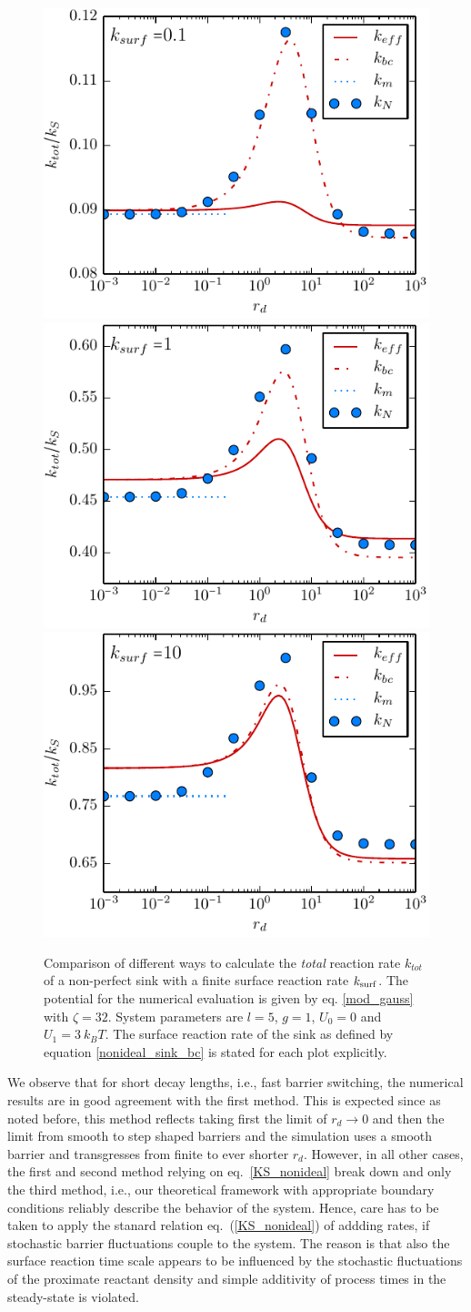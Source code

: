 \documentclass[preprint,superscriptaddress]{revtex4-1}
\begin{document}
\begin{figure}[H]
        \includegraphics[width = .32 \textwidth]{plots/rep_rate_comparison0.pdf} 
        \includegraphics[width = .32 \textwidth]{plots/rep_rate_comparison1.pdf} 
        \includegraphics[width = .32 \textwidth]{plots/rep_rate_comparison2.pdf}
        \caption{Comparison of different ways to calculate the {\it total} reaction rate $k_{tot}$ of a non-perfect sink with a finite surface reaction rate $k_{\rm surf}$. 
        The potential for the numerical evaluation is given by eq. \eqref{mod_gauss} with $\zeta = 32$. System parameters are $l = 5$, $g=1$, 
        $U_0 = 0$ and $U_1 = 3 ~k_B T$. The surface reaction rate of the sink as defined by equation \eqref{nonideal_sink_bc} is stated for 
        each plot explicitly.\label{fig5}} 
    \end{figure}

We observe that for short decay lengths, i.e., fast barrier switching, the numerical results are in good agreement with the first method. This is expected since as noted before, this method reflects taking first the limit of $r_d \rightarrow 0$ and then the limit from smooth to step shaped barriers and the simulation uses a smooth barrier and transgresses from finite to ever shorter $r_d$. However, in all other cases, the first and second method relying on eq.~\eqref{KS_nonideal} break down and only the third method, i.e., our theoretical framework with appropriate boundary conditions reliably describe 
the behavior of the system. Hence, care has to be taken to apply the stanard relation eq.~(\ref{KS_nonideal}) of addding rates, if stochastic
barrier fluctuations couple to the system. The reason is that also the surface reaction time scale appears to be influenced 
by the stochastic fluctuations of the proximate reactant density and simple additivity of process times 
 in the steady-state is violated. 
\end{document}
